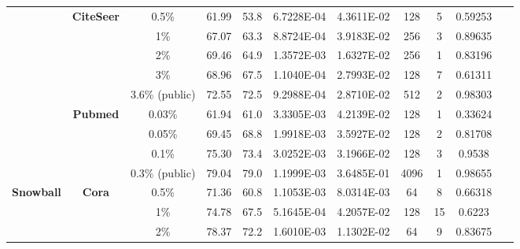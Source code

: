\begin{table}[htbp]
\begin{tabular}{ccccc|cccccc}
          & \multirow{5}[0]{*}{\textbf{CiteSeer}} & 0.5\% & \cellcolor[rgb]{ .388,  .745,  .482}61.99 & \cellcolor[rgb]{ .973,  .412,  .42}53.8 & 6.7228E-04 & 4.3611E-02 & 128   & 5     & 0.59253 & ~ \\
          &       & 1\%   & \cellcolor[rgb]{ .388,  .745,  .482}67.07 & \cellcolor[rgb]{ .973,  .412,  .42}63.3 & 8.8724E-04 & 3.9183E-02 & 256   & 3     & 0.89635 & ~ \\
          &       & 2\%   & \cellcolor[rgb]{ .388,  .745,  .482}69.46 & \cellcolor[rgb]{ .973,  .412,  .42}64.9 & 1.3572E-03 & 1.6327E-02 & 256   & 1     & 0.83196 & ~ \\
          &       & 3\%   & \cellcolor[rgb]{ .388,  .745,  .482}68.96 & \cellcolor[rgb]{ .973,  .412,  .42}67.5 & 1.1040E-04 & 2.7993E-02 & 128   & 7     & 0.61311 & ~ \\
          &       & 3.6\% (public) & \cellcolor[rgb]{ .388,  .745,  .482}72.55 & \cellcolor[rgb]{ .973,  .412,  .42}72.5 & 9.2988E-04 & 2.8710E-02 & 512   & 2     & 0.98303 & ~ \\
          & \multirow{4}[1]{*}{\textbf{Pubmed}} & 0.03\% & \cellcolor[rgb]{ .388,  .745,  .482}61.94 & \cellcolor[rgb]{ .973,  .412,  .42}61.0 & 3.3305E-03 & 4.2139E-02 & 128   & 1     & 0.33624 & ~ \\
          &       & 0.05\% & \cellcolor[rgb]{ .388,  .745,  .482}69.45 & \cellcolor[rgb]{ .973,  .412,  .42}68.8 & 1.9918E-03 & 3.5927E-02 & 128   & 2     & 0.81708 & ~ \\
          &       & 0.1\% & \cellcolor[rgb]{ .388,  .745,  .482}75.30 & \cellcolor[rgb]{ .973,  .412,  .42}73.4 & 3.0252E-03 & 3.1966E-02 & 128   & 3     & 0.9538 & ~ \\
          &       & 0.3\% (public) & \cellcolor[rgb]{ .388,  .745,  .482}79.04 & \cellcolor[rgb]{ .973,  .412,  .42}79.0 & 1.1999E-03 & 3.6485E-01 & 4096  & 1     & 0.98655 & ~ \\
    \midrule
    \multirow{15}[2]{*}{\textbf{Snowball}} & \multirow{6}[1]{*}{\textbf{Cora}} & 0.5\% & \cellcolor[rgb]{ .388,  .745,  .482}71.36 & \cellcolor[rgb]{ .973,  .412,  .42}60.8 & 1.1053E-03 & 8.0314E-03 & 64    & 8     & 0.66318 & ~ \\
          &       & 1\%   & \cellcolor[rgb]{ .388,  .745,  .482}74.78 & \cellcolor[rgb]{ .973,  .412,  .42}67.5 & 5.1645E-04 & 4.2057E-02 & 128   & 15    & 0.6223 & ~ \\
          &       & 2\%   & \cellcolor[rgb]{ .388,  .745,  .482}78.37 & \cellcolor[rgb]{ .973,  .412,  .42}72.2 & 1.6010E-03 & 1.1302E-02 & 64    & 9     & 0.83675 & ~ \\

\end{tabular}
\end{table}
